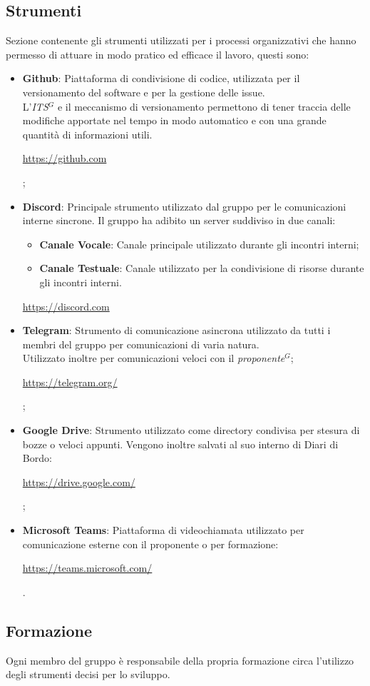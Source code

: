         \subsection{Strumenti}

        Sezione contenente gli strumenti utilizzati per i processi organizzativi che hanno permesso di attuare in modo pratico ed efficace il lavoro, questi sono:

\begin{itemize}
\item \textbf{Github}: Piattaforma di condivisione di codice, utilizzata per il versionamento del software e per la gestione delle issue.\\ L'\emph{ITS}$^{G}$ e il meccanismo di versionamento permettono di tener traccia delle modifiche apportate nel tempo in modo automatico e con una grande quantità di informazioni utili. \begin{center} \url{https://github.com} \end{center};
\item \textbf{Discord}: Principale strumento utilizzato dal gruppo per le comunicazioni interne sincrone. Il gruppo ha adibito un server suddiviso in due canali:
\begin{itemize}
\item \textbf{Canale Vocale}: Canale principale utilizzato durante gli incontri interni;
\item \textbf{Canale Testuale}: Canale utilizzato per la condivisione di risorse durante gli incontri interni.
\end{itemize} \begin{center} \url{https://discord.com} \end{center}
\item \textbf{Telegram}: Strumento di comunicazione asincrona utilizzato da tutti i membri del gruppo per comunicazioni di varia natura.\\ Utilizzato inoltre per comunicazioni veloci con il \emph{proponente}$^{G}$; \begin{center} \url{https://telegram.org/} \end{center};
\item \textbf{Google Drive}: Strumento utilizzato come directory condivisa per stesura di bozze o veloci appunti. Vengono inoltre salvati al suo interno di Diari di Bordo: \begin{center} \url{https://drive.google.com/} \end{center};
\item \textbf{Microsoft Teams}: Piattaforma di videochiamata utilizzato per comunicazione esterne con il proponente o per formazione: \begin{center} \url{https://teams.microsoft.com/} \end{center}.
\end{itemize}

        \subsection{Formazione}

        Ogni membro del gruppo è responsabile della propria formazione circa l'utilizzo degli strumenti decisi per lo sviluppo.
